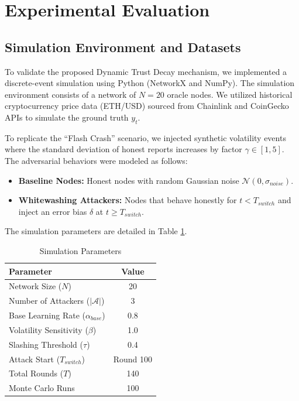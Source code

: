 \documentclass{ieeeaccess}
\begin{document}
\section{Experimental Evaluation}
\label{sec:experiments}

\subsection{Simulation Environment and Datasets}
To validate the proposed Dynamic Trust Decay mechanism, we implemented a discrete-event simulation using Python (NetworkX and NumPy). The simulation environment consists of a network of $N=20$ oracle nodes. We utilized historical cryptocurrency price data (ETH/USD) sourced from Chainlink and CoinGecko APIs to simulate the ground truth $y_t$.

To replicate the ``Flash Crash'' scenario, we injected synthetic volatility events where the standard deviation of honest reports increases by factor $\gamma \in [1, 5]$. The adversarial behaviors were modeled as follows:
\begin{itemize}
    \item \textbf{Baseline Nodes:} Honest nodes with random Gaussian noise $\mathcal{N}(0, \sigma_{noise})$.
    \item \textbf{Whitewashing Attackers:} Nodes that behave honestly for $t < T_{switch}$ and inject an error bias $\delta$ at $t \geq T_{switch}$.
\end{itemize}

The simulation parameters are detailed in Table \ref{tab:params}.

\begin{table}[h]
\caption{Simulation Parameters}
\centering
\begin{tabular}{|l|c|}
\hline
\textbf{Parameter} & \textbf{Value} \\
\hline
Network Size ($N$) & 20 \\
\hline
Number of Attackers ($|\mathcal{A}|$) & 3 \\
\hline
Base Learning Rate ($\alpha_{base}$) & 0.8 \\
\hline
Volatility Sensitivity ($\beta$) & 1.0 \\
\hline
Slashing Threshold ($\tau$) & 0.4 \\
\hline
Attack Start ($T_{switch}$) & Round 100 \\
\hline
Total Rounds ($T$) & 140 \\
\hline
Monte Carlo Runs & 100 \\
\hline
\end{tabular}
\label{tab:params}
\end{table}
\end{document}

